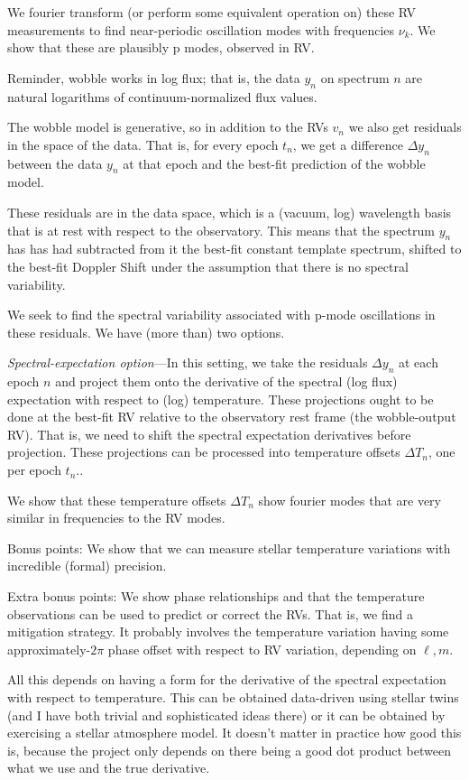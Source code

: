 \documentclass[12pt, letterpaper]{article}
\begin{document}
We fourier transform (or perform some equivalent operation on) these
RV measurements to find near-periodic oscillation modes with
frequencies $\nu_k$. We show that these are plausibly p modes,
observed in RV.

Reminder, wobble works in log flux; that is, the data $y_n$ on
spectrum $n$ are natural logarithms of continuum-normalized flux
values.

The wobble model is generative, so in addition to the RVs $v_n$ we
also get residuals in the space of the data. That is, for every epoch
$t_n$, we get a difference $\Delta y_n$ between the data $y_n$ at that
epoch and the best-fit prediction of the wobble model.

These residuals are in the data space, which is a (vacuum, log)
wavelength basis that is at rest with respect to the observatory. This
means that the spectrum $y_n$ has has had subtracted from it the
best-fit constant template spectrum, shifted to the best-fit Doppler
Shift under the assumption that there is no spectral variability.

We seek to find the spectral variability associated with p-mode
oscillations in these residuals. We have (more than) two options.

\bigskip\noindent
\textsl{Spectral-expectation option}---In this setting, we take the residuals
$\Delta y_n$ at each epoch $n$ and project them onto the derivative of
the spectral (log flux) expectation with respect to (log)
temperature. These projections ought to be done at the best-fit RV
relative to the observatory rest frame (the wobble-output RV). That
is, we need to shift the spectral expectation derivatives before
projection. These projections can be processed into temperature
offsets $\Delta T_n$, one per epoch $t_n$..

We show that these temperature offsets $\Delta T_n$ show fourier modes
that are very similar in frequencies to the RV modes.

Bonus points: We show that we can measure stellar temperature variations
with incredible (formal) precision.

Extra bonus points: We show phase relationships and that the
temperature observations can be used to predict or correct the
RVs. That is, we find a mitigation strategy. It probably involves the
temperature variation having some approximately-$2\pi$ phase offset
with respect to RV variation, depending on $\ell,m$.

All this depends on having a form for the derivative of the spectral
expectation with respect to temperature. This can be obtained
data-driven using stellar twins (and I have both trivial and
sophisticated ideas there) or it can be obtained by exercising a
stellar atmosphere model. It doesn't matter in practice how good this
is, because the project only depends on there being a good dot product
between what we use and the true derivative.
\end{document}
